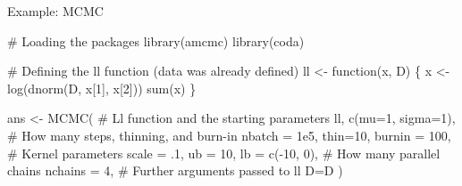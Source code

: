 \documentclass[9pt,ignorenonframetext,]{beamer}
\newenvironment{Shaded}{\begin{snugshade}}{\end{snugshade}}
\newcommand{\KeywordTok}[1]{\textcolor[rgb]{0.94,0.87,0.69}{#1}}
\newcommand{\DataTypeTok}[1]{\textcolor[rgb]{0.87,0.87,0.75}{#1}}
\newcommand{\DecValTok}[1]{\textcolor[rgb]{0.86,0.86,0.80}{#1}}
\newcommand{\FloatTok}[1]{\textcolor[rgb]{0.75,0.75,0.82}{#1}}
\newcommand{\StringTok}[1]{\textcolor[rgb]{0.80,0.58,0.58}{#1}}
\newcommand{\CommentTok}[1]{\textcolor[rgb]{0.50,0.62,0.50}{#1}}
\newcommand{\ControlFlowTok}[1]{\textcolor[rgb]{0.94,0.87,0.69}{#1}}
\newcommand{\OperatorTok}[1]{\textcolor[rgb]{0.94,0.94,0.82}{#1}}
\newcommand{\NormalTok}[1]{\textcolor[rgb]{0.80,0.80,0.80}{#1}}
\begin{document}
\begin{frame}[fragile,t]{Example: MCMC}

\footnotesize

\normalsize

\footnotesize

\begin{Shaded}
\begin{Highlighting}[]
\CommentTok{# Loading the packages}
\KeywordTok{library}\NormalTok{(amcmc)}
\KeywordTok{library}\NormalTok{(coda)}

\CommentTok{# Defining the ll function (data was already defined)}
\NormalTok{ll <-}\StringTok{ }\ControlFlowTok{function}\NormalTok{(x, D) \{}
\NormalTok{  x <-}\StringTok{ }\KeywordTok{log}\NormalTok{(}\KeywordTok{dnorm}\NormalTok{(D, x[}\DecValTok{1}\NormalTok{], x[}\DecValTok{2}\NormalTok{]))}
  \KeywordTok{sum}\NormalTok{(x)}
\NormalTok{\}}

\NormalTok{ans <-}\StringTok{ }\KeywordTok{MCMC}\NormalTok{(}
  \CommentTok{# Ll function and the starting parameters}
\NormalTok{  ll, }\KeywordTok{c}\NormalTok{(}\DataTypeTok{mu=}\DecValTok{1}\NormalTok{, }\DataTypeTok{sigma=}\DecValTok{1}\NormalTok{),}
  \CommentTok{# How many steps, thinning, and burn-in}
  \DataTypeTok{nbatch =} \FloatTok{1e5}\NormalTok{, }\DataTypeTok{thin=}\DecValTok{10}\NormalTok{, }\DataTypeTok{burnin =} \DecValTok{100}\NormalTok{,}
  \CommentTok{# Kernel parameters}
  \DataTypeTok{scale =}\NormalTok{ .}\DecValTok{1}\NormalTok{, }\DataTypeTok{ub =} \DecValTok{10}\NormalTok{, }\DataTypeTok{lb =} \KeywordTok{c}\NormalTok{(}\OperatorTok{-}\DecValTok{10}\NormalTok{, }\DecValTok{0}\NormalTok{),}
  \CommentTok{# How many parallel chains}
  \DataTypeTok{nchains =} \DecValTok{4}\NormalTok{,}
  \CommentTok{# Further arguments passed to ll}
  \DataTypeTok{D=}\NormalTok{D}
\NormalTok{  )}
\end{Highlighting}
\end{Shaded}

\normalsize

\end{frame}
\end{document}
